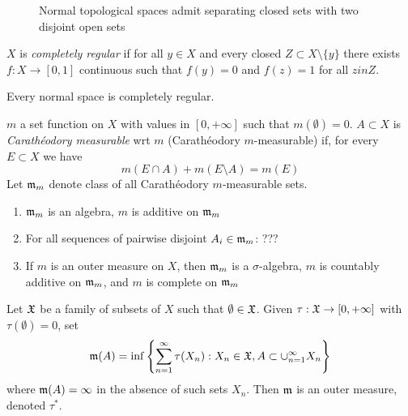 \begin{figure}[ht]
  \centering
  \caption{Normal topological spaces admit separating closed
  sets with two disjoint open sets}
  \label{fig:normal-topological-space}
\end{figure}

\begin{definition}
  $X$ is \emph{completely regular} if for all $y \in X$ and
  every closed $Z \subset X \setminus \{y\}$ there exists
  $f : X \to [0,1]$ continuous such that $f(y) = 0$ and $f(z) = 1$
  for all $z in Z$.
\end{definition}

\begin{lemma}[Urysohn]
  Every normal space is completely regular.
\end{lemma}

\begin{definition}
  $m$ a set function on $X$ with values in $[0,+\infty]$
  such that $m(\emptyset) = 0$.
  $A \subset X$ is \emph{Carath\'eodory measurable} wrt
  $m$ (Carath\'eodory $m$-measurable) if, for every $E \subset X$
  we have
  \[
    m(E \cap A) + m(E \setminus A) = m(E)
  \]
  Let $\mathfrak{m}_m$ denote class of all Carath\'eodory $m$-measurable sets.
\end{definition}

\begin{theorem}
  \begin{enumerate}
    \item $\mathfrak{m}_m$ is an algebra, $m$ is additive on $\mathfrak{m}_m$
    \item For all sequences of pairwise disjoint $A_i \in \mathfrak{m}_m$: ???
    \item If $m$ is an outer measure on $X$, then $\mathfrak{m}_m$ is a $\sigma$-algebra,
      $m$ is countably additive on $\mathfrak{m}_m$, and
      $m$ is complete on $\mathfrak{m}_m$
  \end{enumerate}
\end{theorem}

\begin{example}
  Let $\mathfrak{X}$ be a family of subsets of $X$ such that $\emptyset \in \mathfrak{X}$.
  Given $\tau : \mathfrak{X} \to [0,+\infty]$ with $\tau(\emptyset) = 0$, set
  \[
    \mathfrak{m}(A) = \inf\left\{
      \sum_{n=1}^\infty \tau(X_n) : X_n \in \mathfrak{X}, A \subset \cup_{n=1}^\infty X_n
    \right\}
  \]
  where $\mathfrak{m}(A) = \infty$ in the absence of such sets $X_n$.
  Then $\mathfrak{m}$ is an outer measure, denoted $\tau^*$.
\end{example}

